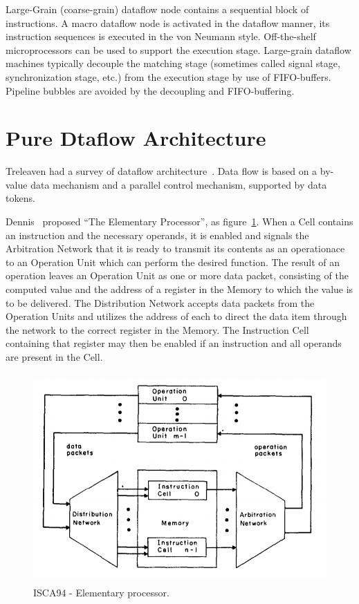 \documentclass[UTF8,12pt,a4paper]{article}
\begin{document}
Large-Grain (coarse-grain) dataflow node contains a sequential block of instructions.
A macro dataflow node is activated in the dataflow manner, 
its instruction sequences is executed in the von Neumann style.
Off-the-shelf microprocessors can be used to support the execution stage. 
Large-grain dataflow machines typically decouple the matching stage
(sometimes called signal stage, synchronization stage, etc.)
from the execution stage by use of FIFO-buffers. 
Pipeline bubbles are avoided by the decoupling and FIFO-buffering. 

\clearpage

\section{Pure Dtaflow Architecture}
Treleaven had a survey of dataflow architecture~\cite{DBLP:journals/csur/TreleavenBH82}.
Data flow is based on a by-value data mechanism
and a parallel control mechanism, supported by data tokens. 

Dennis~\cite{DBLP:conf/isca/DennisM74} proposed ``The Elementary Processor'',
as figure~\ref{fig:elementory_processor}.
When a Cell contains an instruction and the necessary operands,
it is enabled and signals the Arbitration Network
that it is ready to transmit its contents as an operationace
to an Operation Unit which can perform the desired function.
The result of an operation leaves an Operation Unit
as one or more data packet,
consisting of the computed value and the address of a register
in the Memory to which the value is to be delivered.
The Distribution Network accepts data packets
from the Operation Units and utilizes the address of each
to direct the data item through the network to the correct register in the Memory.
The Instruction Cell containing that register may then be enabled
if an instruction and all operands are present in the Cell.

\begin{figure}[htb]
  \begin{small}
    \begin{center}
      \includegraphics[width=\textwidth,height=8cm]{figures/isca94_elementory_processor.png}
    \end{center}
    \caption{ISCA94 - Elementary processor.}
    \label{fig:elementory_processor}
  \end{small}
\end{figure}
\end{document}
